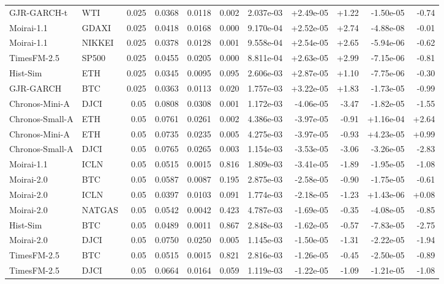 \begin{tabular}{llrrrrrrrrr}
GJR-GARCH-t & WTI & 0.025 & 0.0368 & 0.0118 & 0.002 & 2.037e-03 & +2.49e-05 & +1.22 & -1.50e-05 & -0.74 \\
Moirai-1.1 & GDAXI & 0.025 & 0.0418 & 0.0168 & 0.000 & 9.170e-04 & +2.52e-05 & +2.74 & -4.88e-08 & -0.01 \\
Moirai-1.1 & NIKKEI & 0.025 & 0.0378 & 0.0128 & 0.001 & 9.558e-04 & +2.54e-05 & +2.65 & -5.94e-06 & -0.62 \\
TimesFM-2.5 & SP500 & 0.025 & 0.0455 & 0.0205 & 0.000 & 8.811e-04 & +2.63e-05 & +2.99 & -7.15e-06 & -0.81 \\
Hist-Sim & ETH & 0.025 & 0.0345 & 0.0095 & 0.095 & 2.606e-03 & +2.87e-05 & +1.10 & -7.75e-06 & -0.30 \\
GJR-GARCH & BTC & 0.025 & 0.0363 & 0.0113 & 0.020 & 1.757e-03 & +3.22e-05 & +1.83 & -1.73e-05 & -0.99 \\
Chronos-Mini-A & DJCI & 0.05 & 0.0808 & 0.0308 & 0.001 & 1.172e-03 & -4.06e-05 & -3.47 & -1.82e-05 & -1.55 \\
Chronos-Small-A & ETH & 0.05 & 0.0761 & 0.0261 & 0.002 & 4.386e-03 & -3.97e-05 & -0.91 & +1.16e-04 & +2.64 \\
Chronos-Mini-A & ETH & 0.05 & 0.0735 & 0.0235 & 0.005 & 4.275e-03 & -3.97e-05 & -0.93 & +4.23e-05 & +0.99 \\
Chronos-Small-A & DJCI & 0.05 & 0.0765 & 0.0265 & 0.003 & 1.154e-03 & -3.53e-05 & -3.06 & -3.26e-05 & -2.83 \\
Moirai-1.1 & ICLN & 0.05 & 0.0515 & 0.0015 & 0.816 & 1.809e-03 & -3.41e-05 & -1.89 & -1.95e-05 & -1.08 \\
Moirai-2.0 & BTC & 0.05 & 0.0587 & 0.0087 & 0.195 & 2.875e-03 & -2.58e-05 & -0.90 & -1.75e-05 & -0.61 \\
Moirai-2.0 & ICLN & 0.05 & 0.0397 & 0.0103 & 0.091 & 1.774e-03 & -2.18e-05 & -1.23 & +1.43e-06 & +0.08 \\
Moirai-2.0 & NATGAS & 0.05 & 0.0542 & 0.0042 & 0.423 & 4.787e-03 & -1.69e-05 & -0.35 & -4.08e-05 & -0.85 \\
Hist-Sim & BTC & 0.05 & 0.0489 & 0.0011 & 0.867 & 2.848e-03 & -1.62e-05 & -0.57 & -7.83e-05 & -2.75 \\
Moirai-2.0 & DJCI & 0.05 & 0.0750 & 0.0250 & 0.005 & 1.145e-03 & -1.50e-05 & -1.31 & -2.22e-05 & -1.94 \\
TimesFM-2.5 & BTC & 0.05 & 0.0515 & 0.0015 & 0.821 & 2.816e-03 & -1.26e-05 & -0.45 & -2.50e-05 & -0.89 \\
TimesFM-2.5 & DJCI & 0.05 & 0.0664 & 0.0164 & 0.059 & 1.119e-03 & -1.22e-05 & -1.09 & -1.21e-05 & -1.08 \\

\end{tabular}
